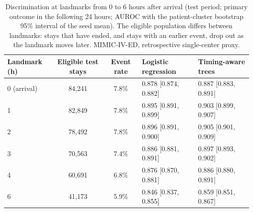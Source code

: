 \begin{table}[t]
\centering
\caption{Discrimination at landmarks from 0 to 6 hours after arrival (test period; primary outcome in the following 24 hours; AUROC with the patient-cluster bootstrap 95\% interval of the seed mean). The eligible population differs between landmarks: stays that have ended, and stays with an earlier event, drop out as the landmark moves later. MIMIC-IV-ED, retrospective single-center proxy.}
\label{tab:sweep}
\begin{tabular}{lccll}
\toprule
Landmark (h) & Eligible test stays & Event rate & Logistic regression & Timing-aware trees \\
\midrule
0 (arrival) & 84,241 & 7.8\% & 0.878 [0.874, 0.882] & 0.887 [0.883, 0.891] \\
1 & 82,849 & 7.8\% & 0.895 [0.891, 0.899] & 0.903 [0.899, 0.907] \\
2 & 78,492 & 7.8\% & 0.896 [0.891, 0.900] & 0.905 [0.901, 0.909] \\
3 & 70,563 & 7.4\% & 0.886 [0.881, 0.891] & 0.897 [0.893, 0.902] \\
4 & 60,691 & 6.8\% & 0.876 [0.870, 0.881] & 0.886 [0.880, 0.891] \\
6 & 41,173 & 5.9\% & 0.846 [0.837, 0.855] & 0.859 [0.851, 0.867] \\
\bottomrule
\end{tabular}
\end{table}
